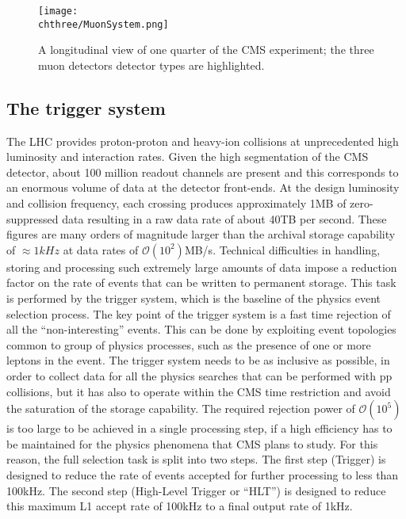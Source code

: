 \begin{figure}[!htb]
 \begin{center}
  \texttt{[image: \\chthree/MuonSystem.png]}
 \end{center}
 \caption{A longitudinal view of one quarter of the CMS experiment; the three muon detectors detector types are highlighted.}
 \label{fig:MuonSystem}
\end{figure}

\subsection{The trigger system}\label{subsec:CMStrigger}

The LHC provides proton-proton and heavy-ion collisions at unprecedented high luminosity and interaction rates.
Given the high segmentation of the CMS detector, about 100 million readout channels are present and this corresponds to an enormous volume of data at the detector front-ends.
At the design luminosity and collision frequency, each crossing produces approximately 1\unit{MB} of zero-suppressed data resulting in a raw data rate of about 40\unit{TB} per second. These figures are many orders of magnitude larger than the archival storage capability of $\approx1\unit{kHz}$ at data rates of $\mathcal{O}(10^2)$\unit{MB/s}.
Technical difficulties in handling, storing and processing such extremely large amounts of data impose a reduction factor on the rate of events that can be written to permanent storage. This task is performed by the trigger system, which is the baseline of the physics event selection process. The key point of the trigger system is a fast time rejection of all the ``non-interesting''
events. This can be done by exploiting event topologies common to group of physics processes, such as the presence of one or more leptons in the event. The trigger system needs to be as inclusive as possible, in order to collect data for all the physics searches that can be performed with pp collisions, but it has also to operate within the CMS time restriction and avoid the saturation of the storage capability. The required rejection power of $\mathcal{O}(10^5)$ is too large to be achieved in a single processing step, if a high efficiency has to be maintained for the physics phenomena that CMS plans to study. For this reason, the full selection task is split into two steps. The first step (\Lone Trigger) is designed to reduce the rate of events accepted for further processing to less than 100\unit{kHz}. The second step (High-Level Trigger or ``HLT'') is designed to reduce this maximum L1 accept rate of 100\unit{kHz} to a final output rate of 1\unit{kHz}.\\

